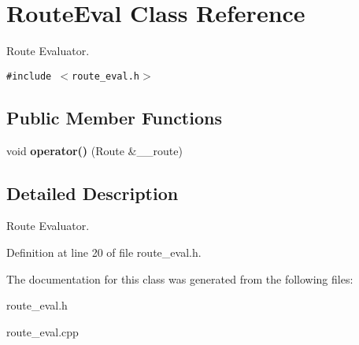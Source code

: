 \section{RouteEval Class Reference}
\label{class_route_eval}
Route Evaluator.  


{\tt \#include $<$route\_\-eval.h$>$}

\subsection*{Public Member Functions}
\begin{CompactItemize}
\item 
void {\bf operator()} (Route \&\_\-\_\-route)\label{class_route_eval_e10bbe6f792e6f44405953de4f703901}

\end{CompactItemize}


\subsection{Detailed Description}
Route Evaluator. 



Definition at line 20 of file route\_\-eval.h.

The documentation for this class was generated from the following files:\begin{CompactItemize}
\item 
route\_\-eval.h\item 
route\_\-eval.cpp\end{CompactItemize}
